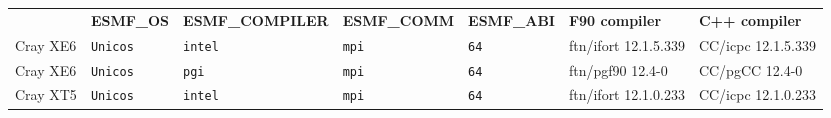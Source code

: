 \begin{longtable}{lllllll}
  &{\bfseries\footnotesize ESMF\_OS} &{\bfseries\footnotesize ESMF\_COMPILER} & {\bfseries\footnotesize ESMF\_COMM} & {\bfseries\footnotesize ESMF\_ABI} &
  {\bfseries\footnotesize F90 compiler} & {\bfseries\footnotesize C++ compiler} \\

Cray XE6              &\tt Unicos &\tt intel        &\tt mpi        &\tt 64              & ftn/ifort \footnotesize 12.1.5.339 & CC/icpc \footnotesize 12.1.5.339\\ %
Cray XE6              &\tt Unicos &\tt pgi          &\tt mpi        &\tt 64              & ftn/pgf90 \footnotesize 12.4-0     & CC/pgCC \footnotesize 12.4-0    \\ %
Cray XT5              &\tt Unicos &\tt intel        &\tt mpi        &\tt 64              & ftn/ifort \footnotesize 12.1.0.233 & CC/icpc \footnotesize 12.1.0.233\\ %

\end{longtable}
